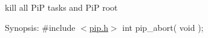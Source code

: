 kill all Pi\-P tasks and Pi\-P root

\begin{DoxyParagraph}{Synopsis\-:}
\#include $<$\hyperlink{pip_8h_source}{pip.\-h}$>$ int pip\-\_\-abort( void ); 
\end{DoxyParagraph}
